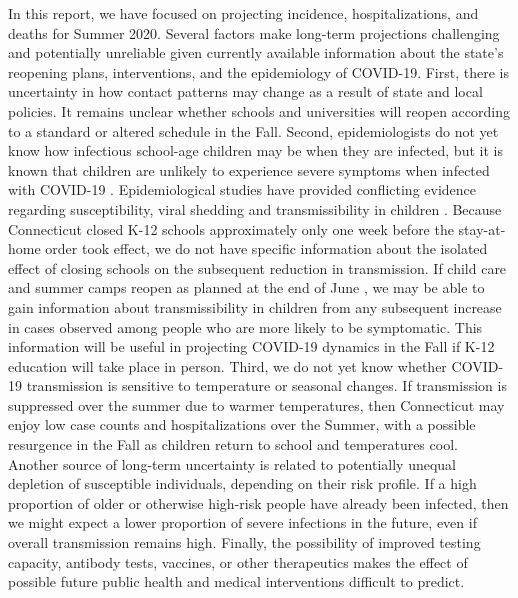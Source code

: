 \documentclass[11pt]{article}
\begin{document}
In this report, we have focused on projecting incidence, hospitalizations, and deaths for Summer 2020. Several factors make long-term projections challenging and potentially unreliable given currently available information about the state's reopening plans, interventions, and the epidemiology of COVID-19.  First, there is uncertainty in how contact patterns may change as a result of state and local policies.  It remains unclear whether schools and universities will reopen according to a standard or altered schedule in the Fall. Second, epidemiologists do not yet know how infectious school-age children may be when they are infected, but it is known that children are unlikely to experience severe symptoms when infected with COVID-19 \citep{verity2020estimates,ludvigsson2020systematic}.  Epidemiological studies have provided conflicting evidence regarding susceptibility, viral shedding and transmissibility in children \citep{lee2020children,viner2020school}.  Because Connecticut closed K-12 schools approximately only one week before the stay-at-home order took effect, we do not have specific information about the isolated effect of closing schools on the subsequent reduction in transmission.  If child care and summer camps reopen as planned at the end of June \citep{dunne2020state}, we may be able to gain information about transmissibility in children from any subsequent increase in cases observed among people who are more likely to be symptomatic.  This information will be useful in projecting COVID-19 dynamics in the Fall if K-12 education will take place in person.  Third, we do not yet know whether COVID-19 transmission is sensitive to temperature or seasonal changes. If transmission is suppressed over the summer due to warmer temperatures, then Connecticut may enjoy low case counts and hospitalizations over the Summer, with a possible resurgence in the Fall as children return to school and temperatures cool. Another source of long-term uncertainty is related to potentially unequal depletion of susceptible individuals, depending on their risk profile.  If a high proportion of older or otherwise high-risk people have already been infected, then we might expect a lower proportion of severe infections in the future, even if overall transmission remains high. Finally, the possibility of improved testing capacity, antibody tests, vaccines, or other therapeutics makes the effect of possible future public health and medical interventions difficult to predict.  









\end{document}
